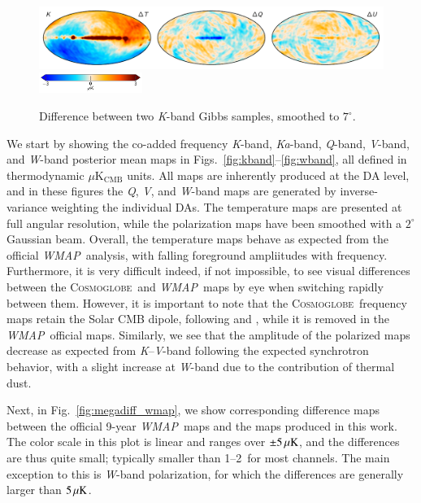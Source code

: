 \documentclass[twocolumn]{../../common/aa}
\def\WMAP{\emph{WMAP}}
\def\WMAPnine{\emph{WMAP9}}
\newcommand{\cosmoglobe}{\textsc{Cosmoglobe}}
\newcommand{\K}[0]{\textit K}
\newcommand{\Ka}[0]{\textit{Ka}}
\newcommand{\Q}[0]{\textit Q}
\newcommand{\V}[0]{\textit V}
\newcommand{\W}[0]{\textit W}
\begin{document}
\begin{figure}[t]
	\centering
	\includegraphics[width=\textwidth]{figures/023-WMAP_K_sampdiff.pdf}\\
	\includegraphics[width=0.30\textwidth]{figures/cbar_3uK.pdf}        
	\caption{Difference between two \K-band Gibbs samples, smoothed to $7^\circ$.}
        \label{fig:Ksampdiff}
\end{figure}

We start by showing the co-added frequency \K-band, \Ka-band, \Q-band, \V-band, and \W-band posterior mean maps in Figs.~\ref{fig:kband}--\ref{fig:wband}, all defined in thermodynamic  $\mu\mathrm{K_{CMB}}$ units. All maps are inherently produced at the DA level, and in these figures the \Q, \V, and \W-band maps are generated by inverse-variance weighting the individual DAs. The temperature maps are presented at full angular resolution, while the polarization maps have been smoothed with a $2^\circ$ Gaussian beam. Overall, the temperature maps behave as expected from the official \WMAP\ analysis, with falling foreground ampliitudes with frequency. Furthermore, it is very difficult indeed, if not impossible, to see visual differences between the \cosmoglobe\ and \WMAP\ maps by eye when switching rapidly between them. However, it is important to note that the \cosmoglobe\ frequency maps retain the Solar CMB dipole, following \citet{npipe} and \citet{bp01}, while it is removed in the \WMAP\ official maps. Similarly, we see that the amplitude of the polarized maps decrease as expected from \K--\V-band following the expected synchrotron behavior, with a slight increase at \W-band due to the contribution of thermal dust. %

Next, in Fig.~\ref{fig:megadiff_wmap}, we show corresponding difference maps between the official 9-year \WMAP\ maps and the maps produced in this work. The color scale in this plot is linear and ranges over $\pm5\muK$, and the differences are thus quite small; typically smaller than 1--2\muK\ for most channels. The main exception to this is \W-band polarization, for which the differences are generally larger than $5\muK$.
\end{document}
